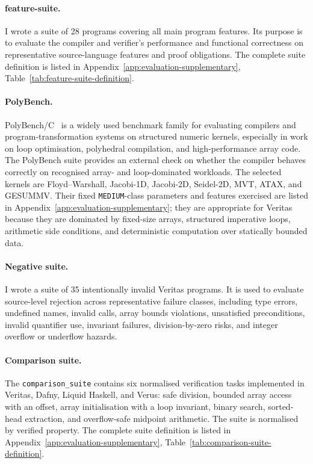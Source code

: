 \paragraph{feature-suite.}
I wrote a suite of 28 programs covering all main program features. Its purpose is to evaluate the compiler and verifier's performance and functional correctness on representative source-language features and proof obligations.
The complete suite definition is listed in Appendix~\ref{app:evaluation-supplementary}, Table~\ref{tab:feature-suite-definition}.

\paragraph{PolyBench.}
PolyBench/C~\cite{PouchetPolyBenchC32} is a widely used benchmark family for evaluating compilers and program-transformation systems on structured numeric kernels, especially in work on loop optimisation, polyhedral compilation, and high-performance array code.
The PolyBench suite provides an external check on whether the compiler behaves correctly on recognised array- and loop-dominated workloads.
The selected kernels are Floyd--Warshall, Jacobi-1D, Jacobi-2D, Seidel-2D, MVT, ATAX, and GESUMMV. Their fixed \texttt{MEDIUM}-class parameters and features exercised are listed in Appendix~\ref{app:evaluation-supplementary}; they are appropriate for Veritas because they are dominated by fixed-size arrays, structured imperative loops, arithmetic side conditions, and deterministic computation over statically bounded data.

\paragraph{Negative suite.}
I wrote a suite of 35 intentionally invalid Veritas programs. It is used to evaluate source-level rejection across representative failure classes, including type errors, undefined names, invalid calls, array bounds violations, unsatisfied preconditions, invalid quantifier use, invariant failures, division-by-zero risks, and integer overflow or underflow hazards.

\paragraph{Comparison suite.}
The \texttt{comparison\_suite} contains six normalised verification tasks implemented in Veritas, Dafny, Liquid Haskell, and Verus: safe division, bounded array access with an offset, array initialisation with a loop invariant, binary search, sorted-head extraction, and overflow-safe midpoint arithmetic. The suite is normalised by verified property.
The complete suite definition is listed in Appendix~\ref{app:evaluation-supplementary}, Table~\ref{tab:comparison-suite-definition}.

